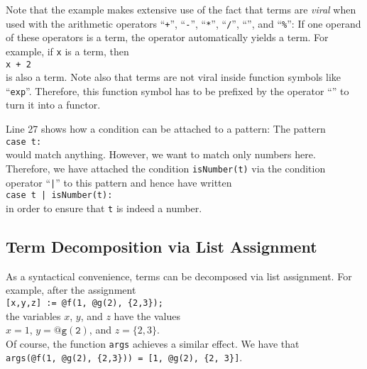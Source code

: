 Note that the example makes extensive use of the fact that terms are \emph{viral} when used with
the arithmetic operators 
``\texttt{+}'', ``\texttt{-}'', ``\texttt{*}'', ``\texttt{/}'', ``\texttt{}'', and
``\texttt{\%}'':  
If one operand of these operators is a term, the operator automatically yields a term.
For example, if \texttt{x} is a term, then
\\[0.2cm]
\hspace*{1.3cm}
\texttt{x + 2}
\\[0.2cm]
is also a term.
Note also that terms are not viral inside function symbols like ``\texttt{exp}''.  Therefore, this
function symbol has to be prefixed by the operator ``\texttt{}'' to turn it
into a functor.

Line 27 shows how a condition can be attached to a pattern:  The pattern 
\\[0.2cm]
\hspace*{1.3cm}
\texttt{case t:}
\\[0.2cm]
would match anything.  However, we want to match only numbers here.  Therefore, we have attached
the condition \texttt{isNumber(t)} via the condition operator ``\texttt{|}'' to this pattern and
hence have written 
\\[0.2cm]
\hspace*{1.3cm}
\texttt{case t | isNumber(t):}
\\[0.2cm]
in order to ensure that \texttt{t} is indeed a number.

\subsection{Term Decomposition via List Assignment}
As a syntactical convenience, terms can be decomposed via list assignment.  For example, after the assignment
\\[0.2cm]
\hspace*{1.3cm}
\texttt{[x,y,z] := @f(1, @g(2), \{2,3\});}
\\[0.2cm]
the variables $x$, $y$, and $z$ have the values
\\[0.2cm]
\hspace*{1.3cm}
$x = 1$, \quad $y = \mathtt{@g(2)}$, \quad and \quad $z = \{2,3\}$.
\\[0.2cm]
Of course, the function \texttt{args} achieves a similar effect.  We have that
\\[0.2cm]
\hspace*{1.3cm}
\texttt{args(@f(1, @g(2), \{2,3\})) = [1, @g(2), \{2, 3\}]}.

